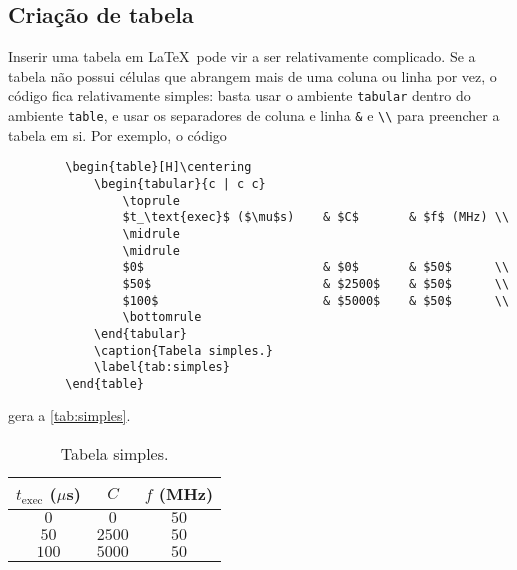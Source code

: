     \subsection{Criação de tabela}
        Inserir uma tabela em \LaTeX~pode vir a ser relativamente complicado.
        Se a tabela não possui células que abrangem mais de uma coluna ou linha por vez,
        o código fica relativamente simples: 
        basta usar o ambiente {\tt tabular} dentro do ambiente {\tt table}, e usar os separadores de coluna e linha
        \verb|&| e \verb|\\| para preencher a tabela em si.
        Por exemplo, o código
        \begin{verbatim}
        \begin{table}[H]\centering
            \begin{tabular}{c | c c}
                \toprule
                $t_\text{exec}$ ($\mu$s)    & $C$       & $f$ (MHz) \\
                \midrule
                \midrule
                $0$                         & $0$       & $50$      \\
                $50$                        & $2500$    & $50$      \\
                $100$                       & $5000$    & $50$      \\
                \bottomrule
            \end{tabular}
            \caption{Tabela simples.}
            \label{tab:simples}
        \end{table}
        \end{verbatim}

        gera a \autoref{tab:simples}.
        \begin{table}[H]\centering
            \begin{tabular}{c | c c}
                \toprule
                $t_\text{exec}$ ($\mu$s)    & $C$       & $f$ (MHz) \\
                \midrule
                \midrule
                $0$                         & $0$       & $50$      \\
                $50$                        & $2500$    & $50$      \\
                $100$                       & $5000$    & $50$      \\
                \bottomrule
            \end{tabular}
            \caption{Tabela simples.}
            \label{tab:simples}
        \end{table}

